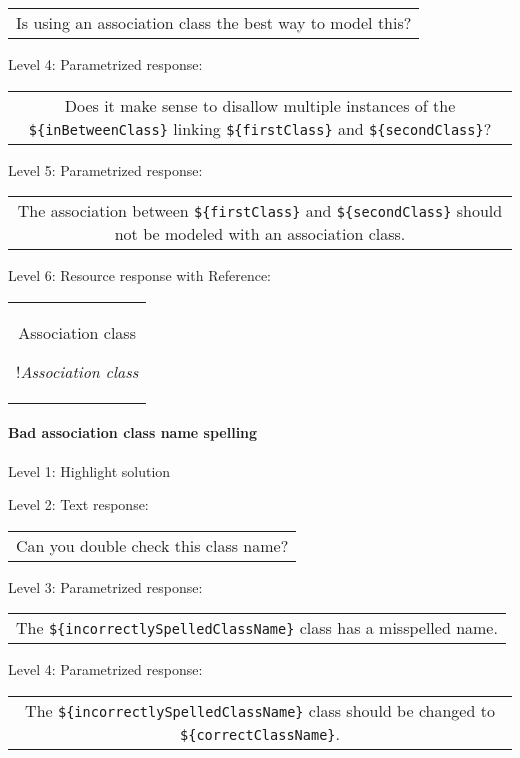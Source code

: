 \begin{tabular}{|c}
Is using an association class the best way to model this?
\end{tabular} \medskip

\noindent Level 4: Parametrized response: \medskip

\begin{tabular}{|c}
Does it make sense to disallow multiple instances of the \verb|${inBetweenClass}| linking \verb|${firstClass}| and \verb|${secondClass}|?
\end{tabular} \medskip

\noindent Level 5: Parametrized response: \medskip

\begin{tabular}{|c}
The association between \verb|${firstClass}| and \verb|${secondClass}| should not be modeled with an association class.
\end{tabular} \medskip

\noindent Level 6: Resource response with Reference:

\begin{tabular}{|c}
Association class

!\textit{Association class}
\end{tabular} \medskip


\paragraph{Bad association class name spelling}

\noindent Level 1: Highlight solution \medskip

\noindent Level 2: Text response: \medskip

\begin{tabular}{|c}
Can you double check this class name?
\end{tabular} \medskip

\noindent Level 3: Parametrized response: \medskip

\begin{tabular}{|c}
The \verb|${incorrectlySpelledClassName}| class has a misspelled name.
\end{tabular} \medskip

\noindent Level 4: Parametrized response: \medskip

\begin{tabular}{|c}
The \verb|${incorrectlySpelledClassName}| class should be changed to \verb|${correctClassName}|.
\end{tabular} \medskip


